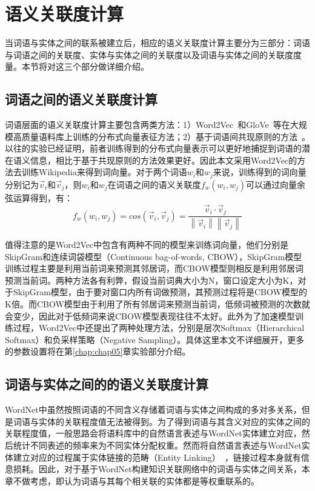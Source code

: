\section{语义关联度计算}
当词语与实体之间的联系被建立后，相应的语义关联度计算主要分为三部分：词语与词语之间的关联度、实体与实体之间的关联度以及词语与实体之间的关联度度量。本节将对这三个部分做详细介绍。

\subsection{词语之间的语义关联度计算}
\label{word2vec}
词语层面的语义关联度计算主要包含两类方法：1）Word2Vec~\cite{corr/Mikolov13}和GloVe~\cite{emnlp/PenningtonSM14}等在大规模高质量语料库上训练的分布式向量表征方法；2）基于词语间共现原则的方法~\cite{aaai/StrubeP06, ijcai/GabrilovichM07}。以往的实验已经证明，前者训练得到的分布式向量表示可以更好地捕捉到词语的潜在语义信息，相比于基于共现原则的方法效果更好。因此本文采用Word2Vec的方法去训练Wikipedia来得到词向量。对于两个词语$w_i$和$w_j$来说，训练得到的词向量分别记为$\vec v_i$和$\vec v_j$，则$w_i$和$w_j$在词语之间的语义关联度$f_w(w_i, w_j)$可以通过向量余弦运算得到，有：
\begin{equation}
    \label{cos}
    f_w(w_i, w_j) = cos(\vec v_i,\vec v_j) = \frac{\vec v_i \cdot 
    \vec v_j}{\left \| \vec v_i \right \|\left \| \vec v_j \right \|}
\end{equation}

值得注意的是Word2Vec中包含有两种不同的模型来训练词向量，他们分别是SkipGram和连续词袋模型（Continuous bag-of-words, CBOW），SkipGram模型训练过程主要是利用当前词来预测其邻居词，而CBOW模型则相反是利用邻居词预测当前词。两种方法各有利弊，假设当前词典大小为N，窗口设定大小为K，对于SkipGram模型，由于要对窗口内所有词做预测，其预测过程将是CBOW模型的K倍。而CBOW模型由于利用了所有邻居词来预测当前词，低频词被预测的次数就会变少，因此对于低频词来说CBOW模型表现往往不太好。此外为了加速模型训练过程，Word2Vec中还提出了两种处理方法，分别是层次Softmax（Hierarchical Softmax）和负采样策略（Negative Sampling）。具体这里本文不详细展开，更多的参数设置将在第\ref{chap:chap05}章实验部分介绍。

\subsection{词语与实体之间的的语义关联度计算}
WordNet中虽然按照词语的不同含义存储着词语与实体之间构成的多对多关系，但是词语与实体的关联程度值无法被得到。为了得到词语与其含义对应的实体之间的关联程度值，一般思路会将语料库中的自然语言表述与WordNet实体建立对应，然后统计不同表述的频率来为不同实体分配权重。然而将自然语言表述与WordNet实体建立对应的过程属于实体链接的范畴（Entity Linking）~\cite{luwei}，链接过程本身就有信息损耗。因此，对于基于WordNet构建知识关联网络中的词语与实体之间关系，本章不做考虑，即认为词语与其每个相关联的实体都是等权重联系的。

